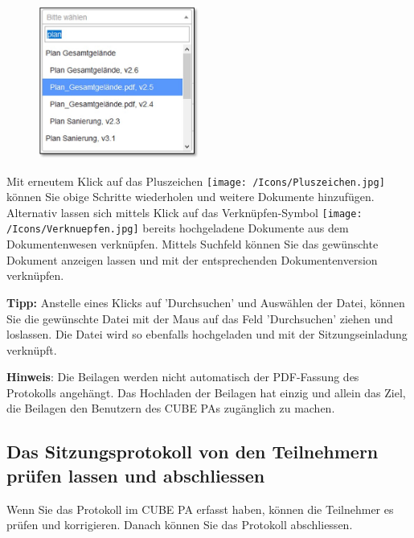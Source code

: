 \begin{figure}
  \vspace{-40pt}
  \begin{center}
    \includegraphics[height=50mm]{../chapters/05_Sitzungswesen/pictures/5-2-3_Verknuepfen.jpg}
  \end{center}
  \vspace{-20pt}
  \vspace{-10pt}
\end{figure}
Mit erneutem Klick auf das Pluszeichen \texttt{[image: /Icons/Pluszeichen.jpg]} können Sie obige Schritte wiederholen und weitere Dokumente hinzufügen. Alternativ lassen sich mittels Klick auf das Verknüpfen-Symbol \texttt{[image: /Icons/Verknuepfen.jpg]}  bereits hochgeladene Dokumente aus dem Dokumentenwesen verknüpfen. Mittels Suchfeld können Sie das gewünschte Dokument anzeigen lassen und mit der entsprechenden Dokumentenversion verknüpfen.

\vspace{\baselineskip}

\textbf{Tipp:} Anstelle eines Klicks auf 'Durchsuchen' und Auswählen der Datei, können Sie die gewünschte Datei mit der Maus auf das Feld 'Durchsuchen' ziehen und loslassen. Die Datei wird so ebenfalls hochgeladen und mit der Sitzungseinladung verknüpft.

\vspace{\baselineskip}

\textbf{Hinweis}: Die Beilagen werden nicht automatisch der PDF-Fassung des Protokolls angehängt. Das Hochladen der Beilagen hat einzig und allein das Ziel, die Beilagen den Benutzern des CUBE PAs zugänglich zu machen.

\subsection{Das Sitzungsprotokoll von den Teilnehmern prüfen lassen und abschliessen}
\label{bkm:Ref434478117}
Wenn Sie das Protokoll im CUBE PA erfasst haben, können die Teilnehmer es prüfen und korrigieren. Danach können Sie das Protokoll abschliessen.

